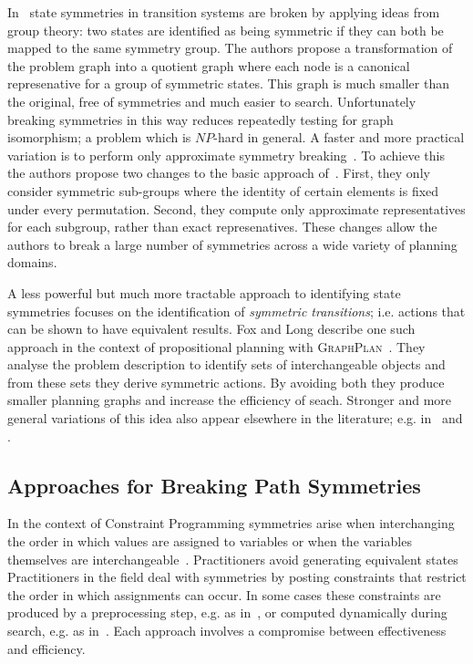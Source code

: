 In~\citep{emerson96} state symmetries in transition systems are broken by applying ideas from 
group theory: two states are identified as being symmetric if they can both be mapped to the same
symmetry group.
The authors propose a transformation of the problem graph into a quotient graph where each node is a
canonical represenative for a group of symmetric states. This graph is 
much smaller than the original, free of symmetries and much easier to search.
Unfortunately breaking symmetries in this way reduces repeatedly testing for graph isomorphism; a
problem which is $NP$-hard in general. 
A faster and more practical variation is to perform only approximate symmetry breaking~\cite{pochter11}.
To achieve this the authors propose two changes to the basic approach of~\citep{emerson96}. First, they 
only consider symmetric sub-groups where the identity of certain elements is fixed under every
permutation. Second, they compute only approximate representatives for each subgroup, rather than
exact represenatives. These changes allow the authors to break a large number of symmetries
across a wide variety of planning domains.

A less powerful but much more tractable approach to identifying state symmetries focuses on 
the identification of \emph{symmetric transitions}; i.e. actions that can be shown to have
equivalent results.
Fox and Long describe one such approach in the context of propositional
planning with \textsc{GraphPlan}~\citep{fox99,fox02}. They analyse the problem description to 
identify sets of interchangeable objects and from these sets they derive symmetric actions. 
By avoiding both they produce smaller planning graphs and increase the efficiency of seach. 
Stronger and more general variations of this idea also appear elsewhere in the literature; e.g. 
in~\citep{rintannen03} and \citep{pochter11}. 


\subsection{Approaches for Breaking Path Symmetries}
In the context of Constraint Programming symmetries arise when interchanging
the order in which values are assigned to variables or when the variables themselves
are interchangeable~\citep{walsh07}. Practitioners avoid generating equivalent states
Practitioners in the field deal with symmetries
by posting constraints that restrict the order in which assignments can occur.
In some cases these constraints are produced by a preprocessing step,
 e.g. as in~\citep{crawford96}, or computed dynamically during search,
 e.g. as in~\cite{roney-dougal04}. Each approach involves a compromise between 
effectiveness and efficiency.

